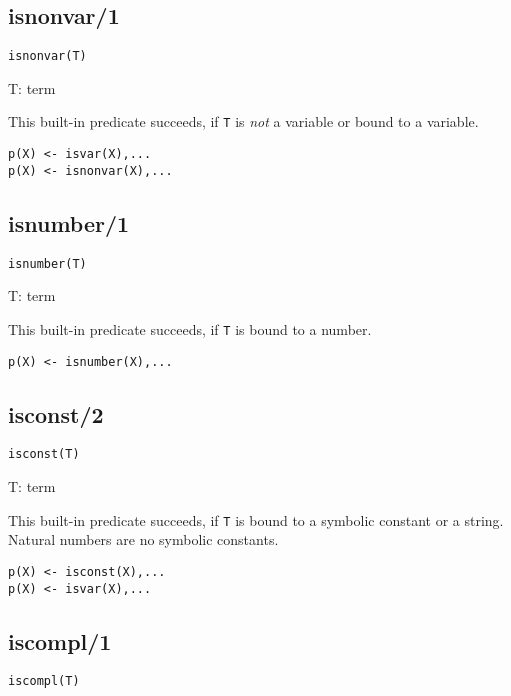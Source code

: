 \subsection{isnonvar/1}

{\tt isnonvar(T)}

T: term


This built-in predicate succeeds, if {\tt T} is
{\em not\/} a variable or bound to a variable. 
\begin{verbatim}
p(X) <- isvar(X),...
p(X) <- isnonvar(X),...
\end{verbatim}

\subsection{isnumber/1}

{\tt isnumber(T)}

T: term


This built-in predicate succeeds, if {\tt T} is
bound to a number.
\begin{verbatim}
p(X) <- isnumber(X),...
\end{verbatim}

\subsection{isconst/2}

{\tt isconst(T)}

T: term


This built-in predicate succeeds, if {\tt T} is
bound to a symbolic constant or a string.
Natural numbers are no symbolic constants.
\begin{verbatim}
p(X) <- isconst(X),...
p(X) <- isvar(X),...
\end{verbatim}

\subsection{iscompl/1}

{\tt iscompl(T)}

